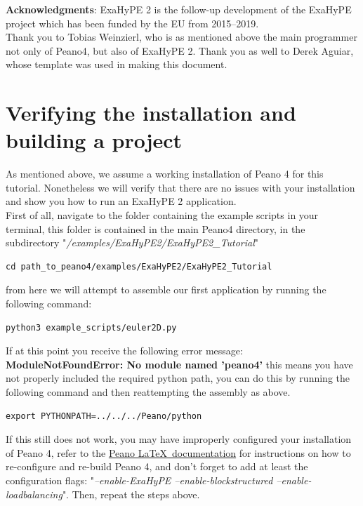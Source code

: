 \documentclass[12pt,letterpaper]{article}
\begin{document}
\textbf{Acknowledgments}:
ExaHyPE 2 is the follow-up development of the ExaHyPE project which has been funded
by the EU from 2015–2019.\\
Thank you to Tobias Weinzierl, who is as mentioned above the main programmer not only of Peano4, but also of ExaHyPE 2. Thank you as well to Derek Aguiar, whose template was used in making this document.


\section{Verifying the installation and building a project}
\label{Verifying_and_building}

\vspace{0.2cm}

As mentioned above, we assume a working installation of Peano 4 for this tutorial. Nonetheless we will verify that there are no issues with your installation and show you how to run an ExaHyPE 2 application.\\
First of all, navigate to the folder containing the example scripts in your terminal, this folder is contained in the main Peano4 directory, in the subdirectory "\textit{/examples/ExaHyPE2/ExaHyPE2\_Tutorial}"\\

\begin{lstlisting}[style = Bash]
cd path_to_peano4/examples/ExaHyPE2/ExaHyPE2_Tutorial
\end{lstlisting}

from here we will attempt to assemble our first application by running the following command:

\begin{lstlisting}[style = Bash]
python3 example_scripts/euler2D.py
\end{lstlisting}

If at this point you receive the following error message:
\textbf{ModuleNotFoundError: No module named 'peano4'} this means you have not properly included the required python path, you can do this by running the following command and then reattempting the assembly as above.

\begin{lstlisting}[style = Bash]
export PYTHONPATH=../../../Peano/python
\end{lstlisting}

If this still does not work, you may have improperly configured your installation of Peano 4, refer to the \hyperlink{http://www.peano-framework.org/peano/p4/\LaTeX~documentation.pdf}{Peano \LaTeX~documentation} for instructions on how to re-configure and re-build Peano 4, and don't forget to add at least the configuration flags: "\textit{--enable-ExaHyPE --enable-blockstructured --enable-loadbalancing}". Then, repeat the steps above.\\
\end{document}
